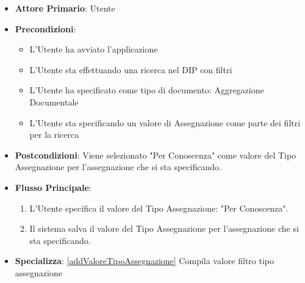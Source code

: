 \begin{itemize}
      \item \textbf{Attore Primario}: Utente
      \item \textbf{Precondizioni}: 
      \begin{itemize}
            \item L'Utente ha avviato l'applicazione
            \item L'Utente sta effettuando una ricerca nel DIP con filtri
            \item L'Utente ha specificato come tipo di documento: Aggregazione Documentale
            \item L'Utente sta specificando un valore di Assegnazione come parte dei filtri per la ricerca
      \end{itemize}
      \item \textbf{Postcondizioni}: Viene selezionato "Per Conoscenza" come valore del Tipo Assegnazione per l'assegnazione che si sta specificando.
      \item \textbf{Flusso Principale}:
      \begin{enumerate}
            \item L'Utente specifica il valore del Tipo Assegnazione: "Per Conoscenza".
            \item Il sistema salva il valore del Tipo Assegnazione per l'assegnazione che si sta specificando.
      \end{enumerate}
      \item \textbf{Specializza}: \ref{addValoreTipoAssegnazione} Compila valore filtro tipo assegnazione
\end{itemize}

